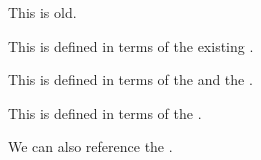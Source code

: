 \documentclass[minimal]{omdoc}
\begin{document}
\begin{module}[name=foo]
  \begin{definition}[id=test.one]
    This  is old.
  \end{definition}

  \begin{definition}
    This  is defined in terms of the existing .
  \end{definition}

  \begin{definition}
    This  is defined in terms of the  and the 
    . 
  \end{definition}

  \begin{definition}
    This  is defined in terms of the
    .
  \end{definition}
  We can also reference the .
\end{module}
\end{document}
